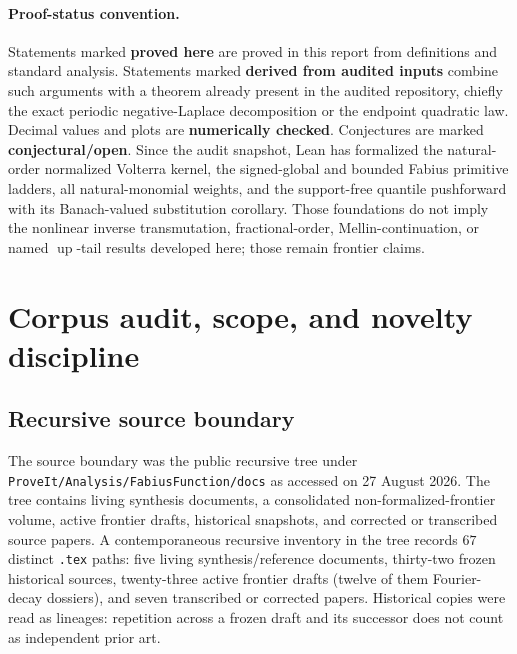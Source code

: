 \documentclass[11pt]{article}
\newcommand{\statusproved}{\textcolor{statusgreen}{\textbf{proved here}}}
\newcommand{\statusderived}{\textcolor{statusblue}{\textbf{derived from audited inputs}}}
\newcommand{\statusnumeric}{\textcolor{statusorange}{\textbf{numerically checked}}}
\newcommand{\statusopen}{\textcolor{statusred}{\textbf{conjectural/open}}}
\theoremstyle{definition}
\theoremstyle{remark}
\newcommand{\Up}{\operatorname{up}}
\newcommand{\repo}{\nolinkurl{ProveIt/Analysis/FabiusFunction/docs}}
\begin{document}
\paragraph{Proof-status convention.}
Statements marked \statusproved{} are proved in this report from definitions and standard
analysis.  Statements marked \statusderived{} combine such arguments with a theorem already
present in the audited repository, chiefly the exact periodic negative-Laplace decomposition
or the endpoint quadratic law.  Decimal values and plots are \statusnumeric{}.  Conjectures
are marked \statusopen{}.  Since the audit snapshot, Lean has formalized the natural-order
normalized Volterra kernel, the signed-global and bounded Fabius primitive ladders, all
natural-monomial weights, and the support-free quantile pushforward with its Banach-valued
substitution corollary.  Those foundations do not imply the nonlinear inverse transmutation,
fractional-order, Mellin-continuation, or named \(\Up\)-tail results developed here; those
remain frontier claims.

\tableofcontents
\clearpage

\section{Corpus audit, scope, and novelty discipline}
\label{sec:audit}

\subsection{Recursive source boundary}

The source boundary was the public recursive tree under \repo{} as accessed on
27 August 2026.  The tree contains living synthesis documents, a consolidated
non-formalized-frontier volume, active frontier drafts, historical snapshots, and corrected or
transcribed source papers.  A contemporaneous recursive inventory in the tree records
$67$ distinct \texttt{.tex} paths: five living synthesis/reference documents, thirty-two
frozen historical sources, twenty-three active frontier drafts (twelve of them Fourier-decay
dossiers), and seven transcribed or corrected papers.  Historical copies were read as
lineages: repetition across a frozen draft and its successor does not count as independent
prior art.
\end{document}

